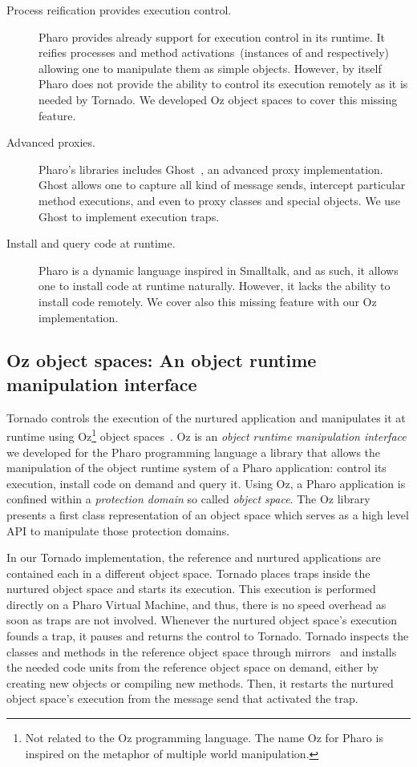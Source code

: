 \begin{description}
\item[Process reification provides execution control.] Pharo provides already support for execution control in its runtime. It reifies processes and method activations~(\ie instances of  and  respectively) allowing one to manipulate them as simple objects. However, by itself Pharo does not provide the ability to control its execution remotely as it is needed by Tornado. We developed Oz object spaces to cover this missing feature.

\item[Advanced proxies.] Pharo's libraries includes Ghost~\cite{Mart11a}, an advanced proxy implementation. Ghost allows one to capture all kind of message sends, intercept particular method executions, and even to proxy classes and special objects. We use Ghost to implement execution traps.

\item[Install and query code at runtime.] Pharo is a dynamic language inspired in Smalltalk, and as such, it allows one to install code at runtime naturally. However, it lacks the ability to install code remotely. We cover also this missing feature with our Oz implementation.

\end{description}

\subsection{Oz object spaces: An object runtime manipulation interface} \label{sec:oz}

Tornado controls the execution of the nurtured application and manipulates it at runtime using Oz\footnote{Not related to the Oz programming language. The name Oz for Pharo is inspired on the metaphor of multiple world manipulation.} object spaces~\cite{Poli13a}. Oz is an \emph{object runtime manipulation interface} we developed for the Pharo programming language \ie a library that allows the manipulation of the object runtime system of a Pharo application: control its execution, install code on demand and query it. Using Oz, a Pharo application is confined within a \emph{protection domain} so called \emph{object space}. The Oz library presents a first class representation of an object space which serves as a high level API to manipulate those protection domains.

In our Tornado implementation, the reference and nurtured applications are contained each in a different object space. Tornado places traps inside the nurtured object space and starts its execution. This execution is performed directly on a Pharo Virtual Machine, and thus, there is no speed overhead as soon as traps are not involved. Whenever the nurtured object space's execution founds a trap, it pauses and returns the control to Tornado. Tornado inspects the classes and methods in the reference object space through mirrors~\cite{Brac04b} and installs the needed code units from the reference object space on demand, either by creating new objects or compiling new methods. Then, it restarts the nurtured object space's execution from the message send that activated the trap.


